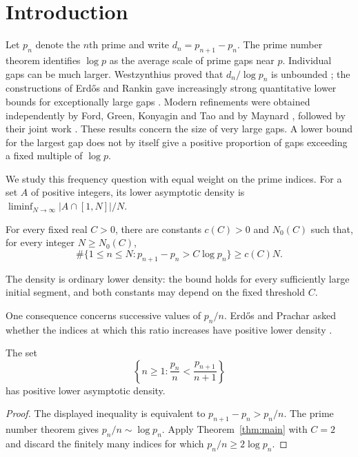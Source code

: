\section{Introduction}

Let $p_n$ denote the $n$th prime and write $d_n=p_{n+1}-p_n$.
The prime number theorem identifies $\log p$ as the average scale of
prime gaps near $p$. Individual gaps can be much larger.
Westzynthius proved that $d_n/\log p_n$ is unbounded
\cite{Westzynthius1931}; the constructions of Erd\H{o}s and Rankin
gave increasingly strong quantitative lower bounds for exceptionally
large gaps \cite{Erdos1935,Rankin1938}.
Modern refinements were obtained independently by Ford, Green,
Konyagin and Tao and by Maynard
\cite{FordGreenKonyaginTao2016,Maynard2016Large}, followed by their
joint work \cite{FordGreenKonyaginMaynardTao2018}.
These results concern the size of very large gaps. A lower bound for
the largest gap does not by itself give a positive proportion of
gaps exceeding a fixed multiple of $\log p$.

We study this frequency question with equal weight on the prime
indices. For a set $A$ of positive integers, its lower asymptotic
density is $\liminf_{N\to\infty}|A\cap[1,N]|/N$.

\begin{theorem}\label{thm:main}
For every fixed real $C>0$, there are constants $c(C)>0$ and $N_0(C)$
such that, for every integer $N\ge N_0(C)$,
\[
 \#\{1\le n\le N:p_{n+1}-p_n>C\log p_n\}\ge c(C)N.
\]
\end{theorem}

The density is ordinary lower density: the bound holds for every
sufficiently large initial segment, and both constants may depend
on the fixed threshold $C$.

One consequence concerns successive values of $p_n/n$.
Erd\H{o}s and Prachar asked whether the indices at which this ratio
increases have positive lower density \cite[p.~256]{ErdosPrachar1962}.

\begin{corollary}\label{cor:ratios}
The set
\[
 \left\{n\ge1:\frac{p_n}{n}<\frac{p_{n+1}}{n+1}\right\}
\]
has positive lower asymptotic density.
\end{corollary}
\begin{proof}
The displayed inequality is equivalent to
$p_{n+1}-p_n>p_n/n$.
The prime number theorem gives $p_n/n\sim\log p_n$.
Apply Theorem~\ref{thm:main} with $C=2$ and discard the finitely many
indices for which $p_n/n\ge2\log p_n$.
\end{proof}

